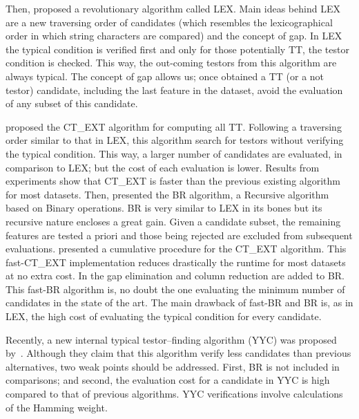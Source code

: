 \documentclass[authoryear,11pt]{elsarticle}
\begin{document}
  Then, \cite{Santiesteban03} proposed a revolutionary algorithm
  called LEX. Main ideas behind LEX are a new traversing order of candidates (which resembles the
  lexicographical order in which string characters are compared) and the concept of gap. In LEX
  the typical condition is verified first and only for those potentially TT, the testor 
  condition is checked. This way, the out-coming testors from this algorithm are always typical.
  The concept of gap allows us; once obtained a TT (or a not testor) candidate, including 
  the last feature in the dataset, avoid the evaluation of any subset of this candidate.
	
  \cite{Sanchez07} proposed the CT\_EXT algorithm for computing all
  TT. Following a traversing order similar to that in LEX, this algorithm search for
  testors without verifying the typical condition. This way, a larger number of candidates are 
  evaluated, in comparison to LEX; but the cost of each evaluation is lower. Results from experiments
  show that CT\_EXT is faster than the previous existing algorithm for most datasets. Then, \cite{Lias09}
  presented the BR algorithm, a Recursive algorithm based on 
  Binary operations. BR is very similar to LEX in its bones but its recursive nature encloses a great
  gain. Given a candidate subset, the remaining features are tested a priori and those being rejected are
  excluded from subsequent evaluations. \cite{Sanchez10} presented a cumulative
  procedure for the CT\_EXT algorithm. This fast-CT\_EXT implementation reduces drastically the runtime
  for most datasets at no extra cost. In \citep{Lias13} the
  gap elimination and column reduction are added to BR. This fast-BR algorithm is, no doubt the one 
  evaluating the minimum number of candidates in the state of the art. The main drawback of fast-BR and 
  BR is, as in LEX, the high cost of evaluating the typical condition for every candidate. 
 
  Recently, a new internal typical testor--finding algorithm (YYC) was proposed by~\cite{Alba14}. Although 
  they claim that this algorithm verify less candidates than previous alternatives, two weak points should
  be addressed. First, BR is not included in comparisons; and second, the evaluation cost for a candidate
  in YYC is high compared to that of previous algorithms. YYC verifications involve calculations of the 
  Hamming weight.
\end{document}
